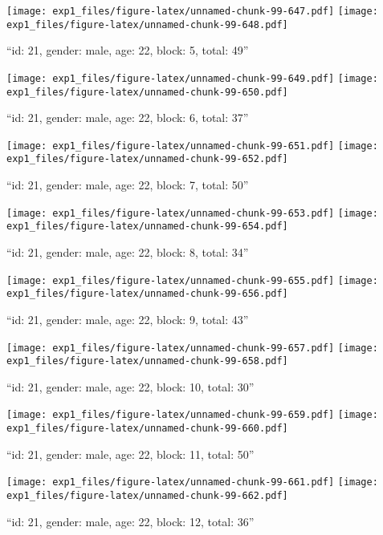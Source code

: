 \documentclass[,]{article}
\begin{document}
\texttt{[image: exp1\_files/figure-latex/unnamed-chunk-99-647.pdf]}
\texttt{[image: exp1\_files/figure-latex/unnamed-chunk-99-648.pdf]}

\newpage
[1] 

``id: 21, gender: male, age: 22, block: 5, total: 49''

\texttt{[image: exp1\_files/figure-latex/unnamed-chunk-99-649.pdf]}
\texttt{[image: exp1\_files/figure-latex/unnamed-chunk-99-650.pdf]}

\newpage
[1] 

``id: 21, gender: male, age: 22, block: 6, total: 37''

\texttt{[image: exp1\_files/figure-latex/unnamed-chunk-99-651.pdf]}
\texttt{[image: exp1\_files/figure-latex/unnamed-chunk-99-652.pdf]}

\newpage
[1] 

``id: 21, gender: male, age: 22, block: 7, total: 50''

\texttt{[image: exp1\_files/figure-latex/unnamed-chunk-99-653.pdf]}
\texttt{[image: exp1\_files/figure-latex/unnamed-chunk-99-654.pdf]}

\newpage
[1] 

``id: 21, gender: male, age: 22, block: 8, total: 34''

\texttt{[image: exp1\_files/figure-latex/unnamed-chunk-99-655.pdf]}
\texttt{[image: exp1\_files/figure-latex/unnamed-chunk-99-656.pdf]}

\newpage
[1] 

``id: 21, gender: male, age: 22, block: 9, total: 43''

\texttt{[image: exp1\_files/figure-latex/unnamed-chunk-99-657.pdf]}
\texttt{[image: exp1\_files/figure-latex/unnamed-chunk-99-658.pdf]}

\newpage
[1] 

``id: 21, gender: male, age: 22, block: 10, total: 30''

\texttt{[image: exp1\_files/figure-latex/unnamed-chunk-99-659.pdf]}
\texttt{[image: exp1\_files/figure-latex/unnamed-chunk-99-660.pdf]}

\newpage
[1] 

``id: 21, gender: male, age: 22, block: 11, total: 50''

\texttt{[image: exp1\_files/figure-latex/unnamed-chunk-99-661.pdf]}
\texttt{[image: exp1\_files/figure-latex/unnamed-chunk-99-662.pdf]}

\newpage
[1] 

``id: 21, gender: male, age: 22, block: 12, total: 36''
\end{document}
